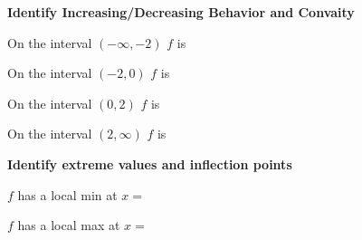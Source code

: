 \documentclass{ximera}
\begin{document}
 \textbf{Identify Increasing/Decreasing Behavior and Convaity}
 
 \begin{question}

On the interval $(-\infty,-2)$ $f$ is
 
 \begin{multipleChoice}
    \end{multipleChoice} 
    \end{question}  
 \begin{question}
  
    On the interval $(-2,0)$ $f$ is
 \begin{multipleChoice}
    \end{multipleChoice}
\end{question}  
 \begin{question}
On the interval $(0,2)$ $f$ is
 
 \begin{multipleChoice}
    \end{multipleChoice}
    \end{question}
 \begin{question}
    On the interval $(2,\infty)$ $f$ is
 
 \begin{multipleChoice}
    \end{multipleChoice}
    \end{question}
    
 \textbf{Identify extreme values and inflection points}
	
	\begin{question}
		$f$ has a local min at $x=$
	\end{question} 
	
	\begin{question}
		$f$ has a local max at $x=$\answer{-2}
	\end{question} 
	
\end{document}
